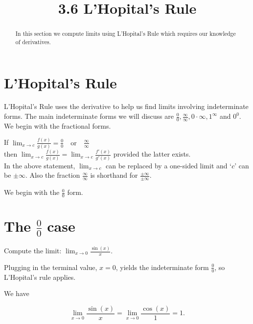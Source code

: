 \documentclass{ximera}
\title{3.6 L'Hopital's Rule}
\begin{document}
\begin{abstract}
In this section we compute limits using L'Hopital's Rule which requires our knowledge of derivatives.
\end{abstract}

\maketitle

\section{L'Hopital's Rule}

L'Hopital's Rule uses the derivative to help us find limits involving indeterminate forms. 
The main indeterminate forms we will discuss are $\frac 00, \frac{\infty}{\infty}, 0\cdot \infty, 1^\infty$ and $0^0$. We begin with the fractional forms.

\begin{theorem}




If $\displaystyle{\lim_{x \to c} \frac{f(x)}{g(x)} = \frac{0}{0} \quad \text{or} \quad \frac{\infty}{\infty}}$\\
then $\displaystyle{\lim_{x \to c} \frac{f(x)}{g(x)} = \lim_{x \to c} \frac{f'(x)}{g'(x)}}$ provided the latter exists.\\
In the above statement, $\lim_{x \to c}$ can be replaced by a one-sided limit and `$c$' can be $\pm \infty$. Also
the fraction $\frac{\infty}{\infty}$ is shorthand for $\frac{\pm \infty}{\pm \infty}$.
\end{theorem}
We begin with the $\frac 00$ form.


\section{The $\frac00$ case}


\begin{example}[example 1]
Compute the limit: \quad $\displaystyle{\lim_{x \to 0} \frac{\sin(x)}{x}}.$

Plugging in the terminal value, $x=0$, yields 
the indeterminate form $\frac00$, so L'Hopital's rule applies.

We have 

\[\lim_{x \to 0} \frac{\sin(x)}{x} = \lim_{x \to 0} \frac{\cos(x)}{1} = 1.\]
\end{example}
\end{document}
